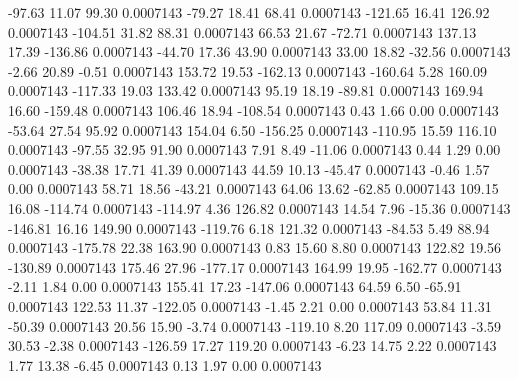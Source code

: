       -97.63       11.07       99.30     0.0007143
      -79.27       18.41       68.41     0.0007143
     -121.65       16.41      126.92     0.0007143
     -104.51       31.82       88.31     0.0007143
       66.53       21.67      -72.71     0.0007143
      137.13       17.39     -136.86     0.0007143
      -44.70       17.36       43.90     0.0007143
       33.00       18.82      -32.56     0.0007143
       -2.66       20.89       -0.51     0.0007143
      153.72       19.53     -162.13     0.0007143
     -160.64        5.28      160.09     0.0007143
     -117.33       19.03      133.42     0.0007143
       95.19       18.19      -89.81     0.0007143
      169.94       16.60     -159.48     0.0007143
      106.46       18.94     -108.54     0.0007143
        0.43        1.66        0.00     0.0007143
      -53.64       27.54       95.92     0.0007143
      154.04        6.50     -156.25     0.0007143
     -110.95       15.59      116.10     0.0007143
      -97.55       32.95       91.90     0.0007143
        7.91        8.49      -11.06     0.0007143
        0.44        1.29        0.00     0.0007143
      -38.38       17.71       41.39     0.0007143
       44.59       10.13      -45.47     0.0007143
       -0.46        1.57        0.00     0.0007143
       58.71       18.56      -43.21     0.0007143
       64.06       13.62      -62.85     0.0007143
      109.15       16.08     -114.74     0.0007143
     -114.97        4.36      126.82     0.0007143
       14.54        7.96      -15.36     0.0007143
     -146.81       16.16      149.90     0.0007143
     -119.76        6.18      121.32     0.0007143
      -84.53        5.49       88.94     0.0007143
     -175.78       22.38      163.90     0.0007143
        0.83       15.60        8.80     0.0007143
      122.82       19.56     -130.89     0.0007143
      175.46       27.96     -177.17     0.0007143
      164.99       19.95     -162.77     0.0007143
       -2.11        1.84        0.00     0.0007143
      155.41       17.23     -147.06     0.0007143
       64.59        6.50      -65.91     0.0007143
      122.53       11.37     -122.05     0.0007143
       -1.45        2.21        0.00     0.0007143
       53.84       11.31      -50.39     0.0007143
       20.56       15.90       -3.74     0.0007143
     -119.10        8.20      117.09     0.0007143
       -3.59       30.53       -2.38     0.0007143
     -126.59       17.27      119.20     0.0007143
       -6.23       14.75        2.22     0.0007143
        1.77       13.38       -6.45     0.0007143
        0.13        1.97        0.00     0.0007143
